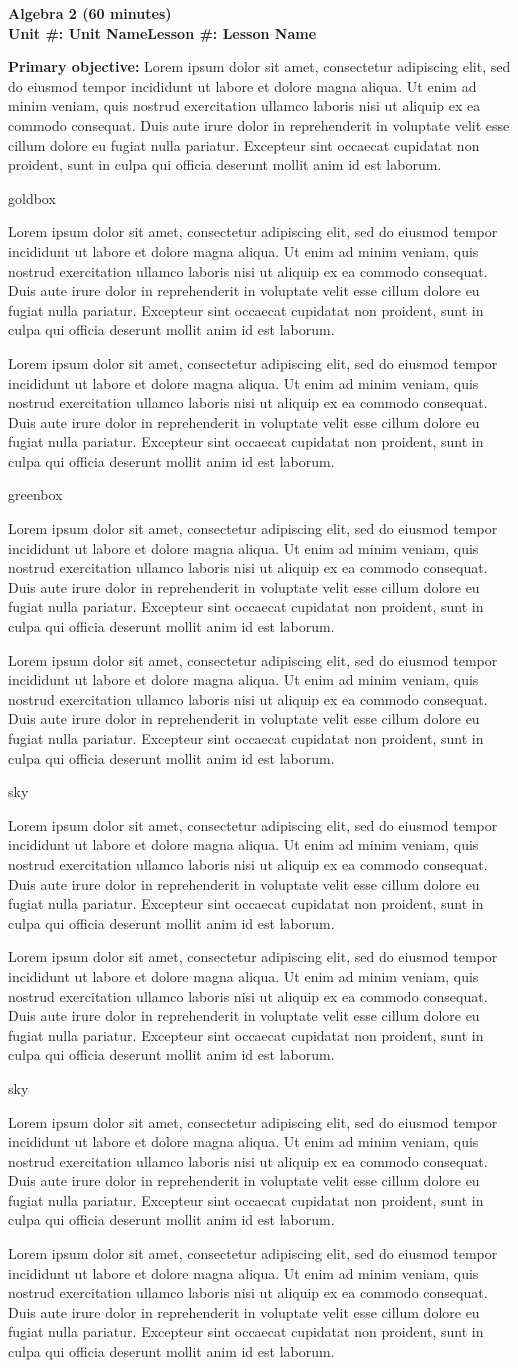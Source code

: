 \documentclass[10pt]{article}
\newcommand{\CourseName}{Algebra 2}
\newcommand{\MeetingLength}{60 minutes}
\newcommand{\UnitNumberName}{Unit \#: Unit Name}
\newcommand{\LessonNumberName}{Lesson \#: Lesson Name}
\newcommand{\LoremIpsum}{
Lorem ipsum dolor sit amet, consectetur adipiscing elit, sed do eiusmod
tempor incididunt ut labore et dolore magna aliqua. Ut enim ad minim
veniam, quis nostrud exercitation ullamco laboris nisi ut aliquip ex ea
commodo consequat. Duis aute irure dolor in reprehenderit in voluptate
velit esse cillum dolore eu fugiat nulla pariatur. Excepteur sint
occaecat cupidatat non proident, sunt in culpa qui officia deserunt
mollit anim id est laborum.
}
\begin{document}
    \begin{center}
        {\Large\bfseries \CourseName{} (\MeetingLength) \\
        {\small \bfseries \UnitNumberName \LessonNumberName } }
    \end{center}

    \begin{tcolorbox}[colback=sky,colframe=navy,boxrule=0.9pt,arc=2mm,left=2mm,right=2mm,top=1.5mm,bottom=1.5mm]
        \textbf{Primary objective:} \LoremIpsum
    \end{tcolorbox}

    \renewcommand{\arraystretch}{1.6}
    \begin{skillbox}{goldbox}
        \begin{minipage}[t]{0.48\linewidth}
            \LoremIpsum
        \end{minipage}
        \hfill
        \begin{minipage}[t]{0.48\linewidth}
            \LoremIpsum
        \end{minipage}
    \end{skillbox}

    \renewcommand{\arraystretch}{1.6}
    \begin{skillbox}{greenbox}
        \begin{minipage}[t]{0.48\linewidth}
            \LoremIpsum
        \end{minipage}
        \hfill
        \begin{minipage}[t]{0.48\linewidth}
            \LoremIpsum
        \end{minipage}
    \end{skillbox}

    \renewcommand{\arraystretch}{1.6}
    \begin{skillbox}{sky}
        \begin{minipage}[t]{0.48\linewidth}
            \LoremIpsum
        \end{minipage}
        \hfill
        \begin{minipage}[t]{0.48\linewidth}
            \LoremIpsum
        \end{minipage}
    \end{skillbox}

    \renewcommand{\arraystretch}{1.6}
    \begin{skillbox}{sky}
        \begin{minipage}[t]{0.48\linewidth}
            \LoremIpsum
        \end{minipage}
        \hfill
        \begin{minipage}[t]{0.48\linewidth}
            \LoremIpsum
        \end{minipage}
    \end{skillbox}
\end{document}
